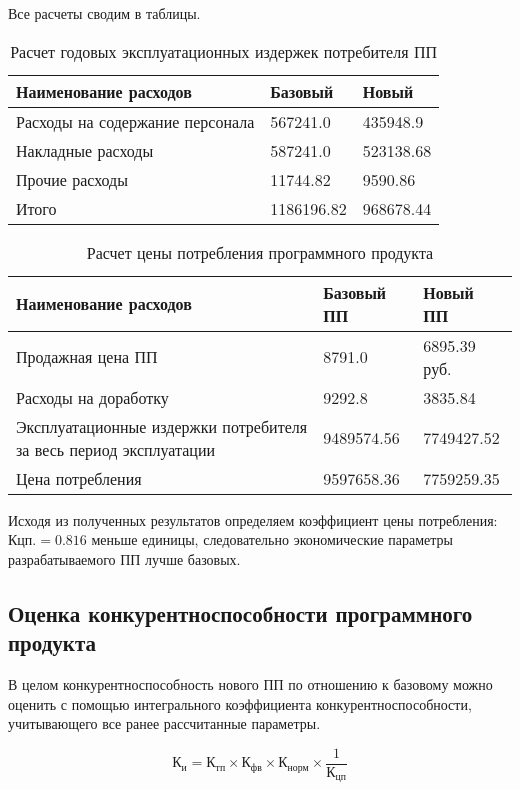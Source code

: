 \begin{par}
Все расчеты сводим в таблицы.
\begin{table}[H]
\caption{Расчет годовых эксплуатационных издержек потребителя ПП}
\begin{tabular}{|l|p{5cm}|p{3.4cm}|}
\hline{}
Наименование расходов & Базовый & Новый \\
\hline{}
Расходы на содержание персонала & 567241.0 & 435948.9\\
\hline{}
Накладные расходы & 587241.0 & 523138.68\\
\hline{}
Прочие расходы & 11744.82 & 9590.86 \\
\hline{}
Итого & 1186196.82 & 968678.44 \\
\hline
\end{tabular}
\label{table:yearEkspIzd}
\end{table}

\begin{table}[H]
\caption{Расчет цены потребления программного продукта}
\begin{tabular}{|p{8cm}|p{4cm}|p{3cm}|}
\hline{}
Наименование расходов &  Базовый ПП & Новый ПП \\
\hline{}
Продажная цена ПП &  8791.0 & 6895.39 руб. \\
\hline{}
Расходы на доработку & 9292.8 & 3835.84 \\
\hline{}
Эксплуатационные издержки потребителя за весь период эксплуатации & 9489574.56 & 7749427.52 \\
\hline{}
Цена потребления & 9597658.36 & 7759259.35\\
\hline
\end{tabular}
\label{table:zhenaPotreblenija}
\end{table}
\end{par}

Исходя из полученных результатов определяем коэффициент цены потребления: $Кцп.=0.816$ меньше единицы,
следовательно экономические параметры разрабатываемого ПП лучше базовых.

\subsection{Оценка конкурентноспособности программного продукта}
В целом конкурентноспособность нового ПП по отношению к базовому можно оценить с помощью интегрального
коэффициента конкурентноспособности, учитывающего все ранее рассчитанные параметры.

\begin{equation}
К_{и} = К_{тп} \times{} К_{фв} \times{} К_{норм} \times{} \frac{1}{К_{цп}}
\end{equation}

